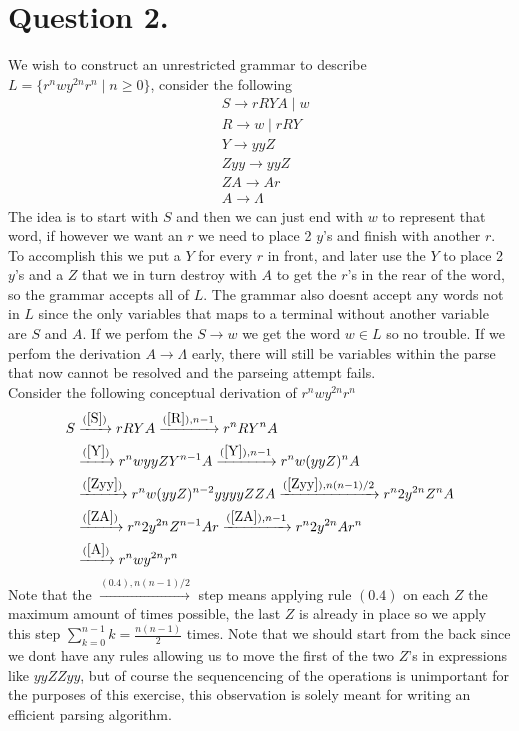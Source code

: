 \documentclass{article}
\theoremstyle{remark}
\numberwithin{equation}{section}
\begin{document}
\section*{Question 2.}
We wish to construct an unrestricted grammar to describe $L =\{ r^n w y^{2n} r^n \mid n\geq 0 \}$, consider the following
\begin{align}
	&S \rightarrow rRYA\mid w \label{S}\\
	&R \rightarrow w\mid rRY \label{R}\\
	&Y \rightarrow yyZ \label{Y}\\
	&Zyy \rightarrow yyZ \label{Zyy}\\
	&ZA \rightarrow Ar \label{ZA}\\
	&A \rightarrow \Lambda \label{A}
\end{align}
The idea is to start with $S$ and then we can just end with $w$ to represent that word, if however we want an $r$ we need to place 2 $y$'s and finish with another $r$. To accomplish this we put a $Y$ for every $r$ in front, and later use the $Y$ to place 2 $y$'s and a $Z$ that we in turn destroy with $A$ to get the $r$'s in the rear of the word, so the grammar accepts all of $L$. The grammar also doesnt accept any words not in $L$ since the only variables that maps to a terminal without another variable are $S$ and $A$. If we perfom the $S\rightarrow w$ we get the word $w\in L$ so no trouble. If we perfom the derivation $A\rightarrow\Lambda$ early, there will still be variables within the parse that now cannot be resolved and the parseing attempt fails.
\\Consider the following conceptual derivation of $r^nwy^{2n}r^n$
\begin{align*}
	S &\xrightarrow{(\ref{S})} rRYA \xrightarrow{(\ref{R}),n-1} r^nRY^nA
	\\&\xrightarrow{(\ref{Y})} r^nwyyZY^{n-1}A \xrightarrow{(\ref{Y}),n-1} r^nw(yyZ)^{n}A 
	\\&\xrightarrow{(\ref{Zyy})} r^nw(yyZ)^{n-2}yyyyZZA \xrightarrow{(\ref{Zyy}),n(n-1)/2} r^n2y^{2n}Z^nA
	\\&\xrightarrow{(\ref{ZA})} r^n2y^{2n}Z^{n-1}Ar \xrightarrow{(\ref{ZA}),n-1} r^n2y^{2n}Ar^n
	\\&\xrightarrow{(\ref{A})} r^nwy^{2n}r^n
\end{align*}
Note that the $\xrightarrow{(0.4),n(n-1)/2}$ step means applying rule $(0.4)$ on each $Z$ the maximum amount of times possible, the last $Z$ is already in place so we apply this step $\sum_{k=0}^{n-1} k = \frac{n(n-1)}{2}$ times. Note that we should start from the back since we dont have any rules allowing us to move the first of the two $Z$'s in expressions like $yyZZyy$, but of course the sequencencing of the operations is unimportant for the purposes of this exercise, this observation is solely meant for writing an efficient parsing algorithm.
\end{document}
